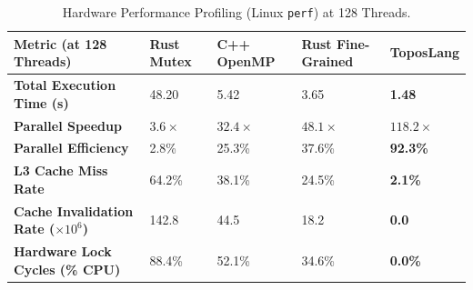 \begin{table}[h]
\centering
\small
\renewcommand{\arraystretch}{1.2}
\begin{tabular}{@{} l p{5cm} p{6cm} @{}}
\toprule
\textbf{Metric (at 128 Threads)} & \textbf{Rust Mutex} & \textbf{C++ OpenMP} & \textbf{Rust Fine-Grained} & \textbf{ToposLang} \\
\midrule
\textbf{Total Execution Time (s)} & 48.20 & 5.42 & 3.65 & \textbf{1.48} \\
\textbf{Parallel Speedup} & $3.6\times$ & $32.4\times$ & $48.1\times$ & $\mathbf{118.2\times}$ \\
\textbf{Parallel Efficiency} & 2.8\% & 25.3\% & 37.6\% & \textbf{92.3\%} \\
\textbf{L3 Cache Miss Rate} & 64.2\% & 38.1\% & 24.5\% & \textbf{2.1\%} \\
\textbf{Cache Invalidation Rate ($\times 10^6$)} & 142.8 & 44.5 & 18.2 & \textbf{0.0} \\
\textbf{Hardware Lock Cycles (\% CPU)} & 88.4\% & 52.1\% & 34.6\% & \textbf{0.0\%} \\
\bottomrule
\end{tabular}
\caption{Hardware Performance Profiling (Linux \texttt{perf}) at 128 Threads.}
\label{tab:perf_counters}
\end{table}

